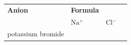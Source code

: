 \begin{enumerate}[noitemsep, label=\textbf{\arabic*}. ]
{\begin{tabular}[t]{|l|l|l|l|}
    
        \textbf{Anion} &
    
    
        \textbf{Formula}%
     \tabularnewline\cline{1-1}\cline{2-2}\cline{3-3}\cline{4-4}
    
    
         &
    
    
        \begin{math}\mathrm{Na}{}^{+}\end{math} &
    
    
        \begin{math}\mathrm{Cl}{}^{-}\end{math} &
    
    
     \tabularnewline\cline{1-1}\cline{2-2}\cline{3-3}\cline{4-4}
    
    
        potassium bromide &
    

\end{tabular}}
\end{enumerate}
